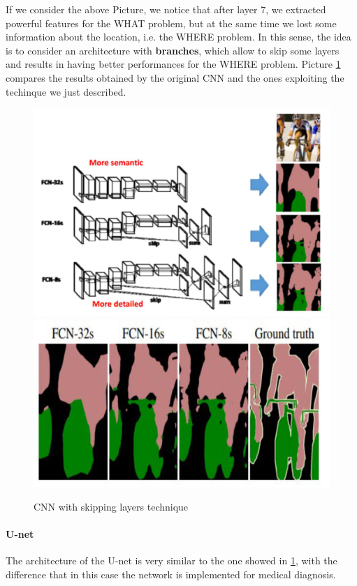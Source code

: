 If we consider the above Picture, we notice that after layer 7, we extracted powerful features for the WHAT problem, but at the same time we lost some information about the location, i.e. the WHERE problem. In this sense, the idea is to consider an architecture with \textbf{branches}, which allow to skip some layers and results in having better performances for the WHERE problem. Picture \ref{skip layers} compares the results obtained by the original CNN and the ones exploiting the techinque we just described.

\begin{figure}[h!]
		\centering
        \includegraphics[scale = 0.3]{img/semantic4.jpg}
        \includegraphics[scale = 0.3]{img/semantic5.jpg}
		\label{skip layers}
        \caption{CNN with skipping layers technique}
\end{figure}

\paragraph{U-net}
The architecture of the U-net is very similar to the one showed in \ref{skip layers}, with the difference that in this case the network is implemented for medical diagnosis. 

